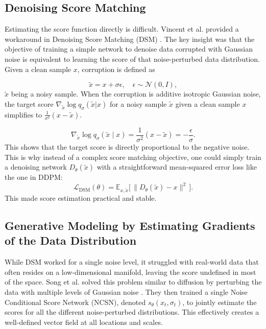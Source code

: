 \subsection {Denoising Score Matching}
Estimating the score function directly is difficult. Vincent et al. provided a workaround in Denoising Score Matching (DSM) \cite{vincentConnectionScoreMatching2011a}. The key insight was that the objective of training a simple network to denoise data corrupted with Gaussian noise is equivalent to learning the score of that noise-perturbed data distribution. Given a clean sample $x$, corruption is defined as

\begin{equation}
	\tilde{x} = x + \sigma \epsilon, \quad \epsilon \sim \mathcal{N}(0, I),
\end{equation}
$\tilde x$ being a noisy sample. When the corruption is additive isotropic Gaussian noise, the target score $\nabla_{\tilde{x}} \log q_{\sigma}(\tilde{x}|x)$ for a noisy sample $\tilde{x}$  given a clean sample $x$ simplifies to $\frac{1}{\sigma^2}(x - \tilde{x})$. 

\begin{equation}
	\nabla_{\tilde{x}} \log q_\sigma(\tilde{x} \mid x)
	= \frac{1}{\sigma^2}(x - \tilde{x} ) = -\frac{\epsilon}{\sigma}.
\end{equation}
This shows that the target score is directly proportional to the negative noise. This is why instead of a complex score matching objective, one could simply train a denoising network $D_\theta(\tilde{x})$ with a straightforward mean-squared error loss like the one in DDPM:
\begin{equation}
	\mathcal{L}_{\text{DSM}}(\theta) = \mathbb{E}_{x, \tilde{x}} \Big[ \, \lVert D_\theta(\tilde{x}) - x \rVert^2 \, \Big].
\end{equation}
This made score estimation practical and stable.

\subsection{Generative Modeling by Estimating Gradients of the Data Distribution}
While DSM worked for a single noise level, it struggled with real-world data that often resides on a low-dimensional manifold, leaving the score undefined in most of the space. Song et al. solved this problem similar to diffusion by perturbing the data with multiple levels of Gaussian noise \cite{songGenerativeModelingEstimating2020a}. They then trained a single Noise Conditional Score Network (NCSN), denoted $s_{\theta}(x_t,σ_t)$, to jointly estimate the scores for all the different noise-perturbed distributions. This effectively creates a well-defined vector field at all locations and scales.

